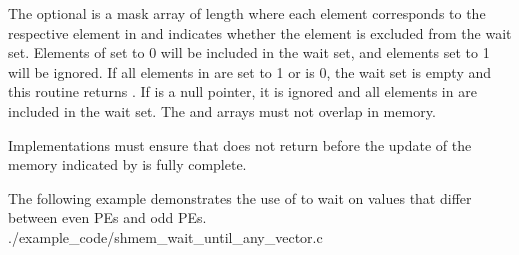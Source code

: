 \begin{apidefinition}
{    The optional  is a mask array of length  where each
    element corresponds to the respective element in  and indicates
    whether the element is excluded from the wait set.  Elements of
     set to 0 will be included in the wait set, and elements set to
    1 will be ignored.  If all elements in  are set to 1 or
     is 0, the wait set is empty and this routine returns
    .  If  is a null pointer, it is ignored and
    all elements in  are included in the wait set.  The 
    and  arrays must not overlap in memory.

    Implementations must ensure that 
    does not return before the update of the memory indicated by  is
    fully complete.
}


\begin{apiexamples}
  \apicexample
      {The following \Cstd[11] example demonstrates the use of
       to wait on values that differ
      between even PEs and odd PEs.}
      {./example_code/shmem_wait_until_any_vector.c}
      {}
\end{apiexamples}

\end{apidefinition}

